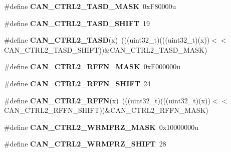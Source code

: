 \begin{DoxyCompactItemize}
\item 
\#define {\bfseries C\+A\+N\+\_\+\+C\+T\+R\+L2\+\_\+\+T\+A\+S\+D\+\_\+\+M\+A\+SK}~0x\+F80000u\hypertarget{group__CAN__Register__Masks_ga50bd2b3ca86be2357515614d717e8167}{}\label{group__CAN__Register__Masks_ga50bd2b3ca86be2357515614d717e8167}

\item 
\#define {\bfseries C\+A\+N\+\_\+\+C\+T\+R\+L2\+\_\+\+T\+A\+S\+D\+\_\+\+S\+H\+I\+FT}~19\hypertarget{group__CAN__Register__Masks_gac9265ea7ee9b07803fdb62c92aa85ea0}{}\label{group__CAN__Register__Masks_gac9265ea7ee9b07803fdb62c92aa85ea0}

\item 
\#define {\bfseries C\+A\+N\+\_\+\+C\+T\+R\+L2\+\_\+\+T\+A\+SD}(x)~(((uint32\+\_\+t)(((uint32\+\_\+t)(x))$<$$<$C\+A\+N\+\_\+\+C\+T\+R\+L2\+\_\+\+T\+A\+S\+D\+\_\+\+S\+H\+I\+FT))\&C\+A\+N\+\_\+\+C\+T\+R\+L2\+\_\+\+T\+A\+S\+D\+\_\+\+M\+A\+SK)\hypertarget{group__CAN__Register__Masks_gaf3ad35b3f0ed4a3a4fea9d9fff938109}{}\label{group__CAN__Register__Masks_gaf3ad35b3f0ed4a3a4fea9d9fff938109}

\item 
\#define {\bfseries C\+A\+N\+\_\+\+C\+T\+R\+L2\+\_\+\+R\+F\+F\+N\+\_\+\+M\+A\+SK}~0x\+F000000u\hypertarget{group__CAN__Register__Masks_ga2cf8e472f27dccf6b1e9b9af80f76542}{}\label{group__CAN__Register__Masks_ga2cf8e472f27dccf6b1e9b9af80f76542}

\item 
\#define {\bfseries C\+A\+N\+\_\+\+C\+T\+R\+L2\+\_\+\+R\+F\+F\+N\+\_\+\+S\+H\+I\+FT}~24\hypertarget{group__CAN__Register__Masks_ga573803e007b6904ec3b8c5ab45acf33e}{}\label{group__CAN__Register__Masks_ga573803e007b6904ec3b8c5ab45acf33e}

\item 
\#define {\bfseries C\+A\+N\+\_\+\+C\+T\+R\+L2\+\_\+\+R\+F\+FN}(x)~(((uint32\+\_\+t)(((uint32\+\_\+t)(x))$<$$<$C\+A\+N\+\_\+\+C\+T\+R\+L2\+\_\+\+R\+F\+F\+N\+\_\+\+S\+H\+I\+FT))\&C\+A\+N\+\_\+\+C\+T\+R\+L2\+\_\+\+R\+F\+F\+N\+\_\+\+M\+A\+SK)\hypertarget{group__CAN__Register__Masks_ga74a275be00e2474d0621b2f09968440c}{}\label{group__CAN__Register__Masks_ga74a275be00e2474d0621b2f09968440c}

\item 
\#define {\bfseries C\+A\+N\+\_\+\+C\+T\+R\+L2\+\_\+\+W\+R\+M\+F\+R\+Z\+\_\+\+M\+A\+SK}~0x10000000u\hypertarget{group__CAN__Register__Masks_ga5f73e5da9fb12e711d2b23b7092788f2}{}\label{group__CAN__Register__Masks_ga5f73e5da9fb12e711d2b23b7092788f2}

\item 
\#define {\bfseries C\+A\+N\+\_\+\+C\+T\+R\+L2\+\_\+\+W\+R\+M\+F\+R\+Z\+\_\+\+S\+H\+I\+FT}~28\hypertarget{group__CAN__Register__Masks_ga1ada3c4c31b40ac2d1d0aa69b8beead7}{}\label{group__CAN__Register__Masks_ga1ada3c4c31b40ac2d1d0aa69b8beead7}


\end{DoxyCompactItemize}
